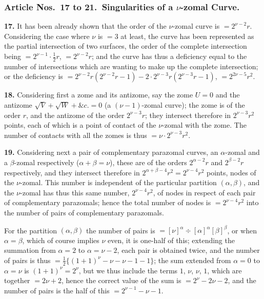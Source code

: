 \documentclass[11pt,a4paper]{article}
\theoremstyle{definition}
\begin{document}
\subsubsection*{Article Nos.\ 17 to 21.\ Singularities of a $\nu$-zomal Curve.}

\setcounter{page}{479}

\noindent\textbf{17.} It has been already shown that the order of the $\nu$-zomal curve is $=2^{\nu-2}r$. Considering the case where $\nu$ is $=3$ at least, the curve has been represented as the partial intersection of two surfaces, the order of the complete intersection being $=2^{\nu-1}\cdot\frac{1}{2}r$, $=2^{\nu-2}r$; and the curve has thus a deficiency equal to the number of intersections which are wanting to make up the complete intersection; or the deficiency is $=2^{\nu-2}r(2^{\nu-2}r-1)-2\cdot 2^{\nu-3}r(2^{\nu-3}r-1)$, $=2^{2\nu-5}r^2$.

\noindent\textbf{18.} Considering first a zome and its antizome, say the zome $U=0$ and the antizome $\sqrt{V}+\sqrt{W}+\&c.=0$ (a $(\nu-1)$-zomal curve); the zome is of the order $r$, and the antizome of the order $2^{\nu-3}r$; they intersect therefore in $2^{\nu-3}r^2$ points, each of which is a point of contact of the $\nu$-zomal with the zome. The number of contacts with all the zomes is thus $=\nu\cdot 2^{\nu-3}r^2$.

\noindent\textbf{19.} Considering next a pair of complementary parazomal curves, an $\alpha$-zomal and a $\beta$-zomal respectively ($\alpha+\beta=\nu$), these are of the orders $2^{\alpha-2}r$ and $2^{\beta-2}r$ respectively, and they intersect therefore in $2^{\alpha+\beta-4}r^2=2^{\nu-4}r^2$ points, nodes of the $\nu$-zomal. This number is independent of the particular partition $(\alpha,\beta)$, and the $\nu$-zomal has thus this same number, $2^{\nu-4}r^2$, of nodes in respect of each pair of complementary parazomals; hence the total number of nodes is $=2^{\nu-4}r^2$ into the number of pairs of complementary parazomals.

For the partition $(\alpha,\beta)$ the number of pairs is $=[\nu]^\alpha\div[\alpha]^\alpha[\beta]^\beta$, or when $\alpha=\beta$, which of course implies $\nu$ even, it is one-half of this; extending the summation from $\alpha=2$ to $\alpha=\nu-2$, each pair is obtained twice, and the number of pairs is thus $=\frac{1}{2}\{(1+1)^\nu-\nu-\nu-1-1\}$; the sum extended from $\alpha=0$ to $\alpha=\nu$ is $(1+1)^\nu=2^\nu$, but we thus include the terms $1$, $\nu$, $\nu$, $1$, which are together $=2\nu+2$, hence the correct value of the sum is $=2^\nu-2\nu-2$, and the number of pairs is the half of this $=2^{\nu-1}-\nu-1$.
\end{document}
